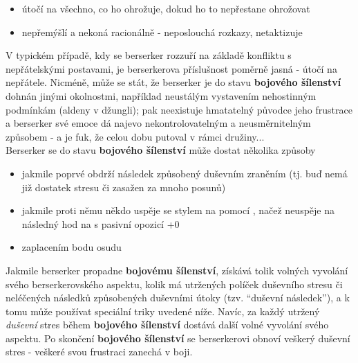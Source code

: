 \documentclass[../main.tex]{subfiles}
\begin{document}
\begin{itemize}
\item útočí na všechno, co ho ohrožuje, dokud ho to nepřestane ohrožovat
\item nepřemýšlí a nekoná racionálně - neposlouchá rozkazy, netaktizuje
\end{itemize}
V typickém případě, kdy se berserker rozzuří na základě konfliktu s nepřátelskými postavami, je berserkerova příslušnost poměrně jasná - útočí na nepřátele. Nicméně, může se stát, že berserker je do stavu \textbf{bojového šílenství} dohnán jinými okolnostmi, například neustálým vystavením nehostinným podmínkám (aldeny v džungli); pak neexistuje hmatatelný původce jeho frustrace a berserker své emoce dá najevo nekontrolovatelným a neusměrnitelným způsobem - a je fuk, že celou dobu putoval v rámci družiny...\\
Berserker se do stavu \textbf{bojového šílenství} může dostat několika způsoby
\begin{itemize}
\item jakmile poprvé obdrží následek způsobený duševním zraněním (tj. buď nemá již dostatek stresu či zasažen za mnoho posunů)
\item jakmile proti němu někdo uspěje se stylem na  pomocí , načež neuspěje na následný hod na  s pasivní opozicí +0
\item zaplacením bodu osudu
\end{itemize}

Jakmile berserker propadne \textbf{bojovému šílenství}, získává tolik volných vyvolání svého berserkerovského aspektu, kolik má utržených políček duševního stresu či neléčených následků způsobených duševními útoky (tzv. ``duševní následek''), a k tomu může používat speciální triky uvedené níže. Navíc, za každý utržený \textit{duševní} stres během \textbf{bojového šílenství} dostává další volné vyvolání svého aspektu. Po skončení \textbf{bojového šílenství} se berserkerovi obnoví veškerý duševní stres - veškeré svou frustraci zanechá v boji.
\end{document}

